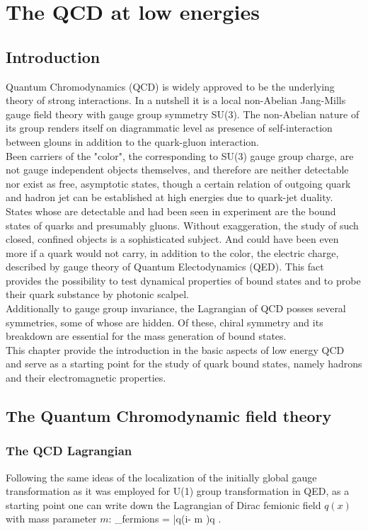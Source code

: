 \chapter{The QCD at low energies}
\label{chap:QCD_low}

\section{Introduction}
Quantum Chromodynamics (QCD) is widely approved to be the underlying theory of strong interactions. In a nutshell it is a local non-Abelian Jang-Mills gauge field theory with gauge group symmetry SU(3). The non-Abelian nature of its group renders itself on diagrammatic level as presence of self-interaction between glouns in addition to the quark-gluon interaction. 
\\

Been carriers of the "color", the corresponding to SU(3) gauge group charge, are not gauge independent objects themselves, and therefore are neither detectable nor exist as free, asymptotic states, though a certain relation of outgoing quark and hadron jet can be established at high energies due to quark-jet duality. States whose are detectable and had been seen in experiment are the bound states of quarks and presumably gluons. Without exaggeration, the study of such closed, confined objects is a sophisticated subject. And could have been even more if a quark would not carry, in addition to the color, the electric charge, described by gauge theory of Quantum Electodynamics (QED). This fact provides the possibility to test dynamical properties of bound states and to probe their quark substance by photonic scalpel. 
\\

Additionally to gauge group invariance, the Lagrangian of QCD posses several symmetries, some of whose are hidden. Of these, chiral symmetry and its breakdown are essential for the mass generation of bound states. 
\\

This chapter provide the introduction in the basic aspects of low energy QCD and serve as a starting point for the study of quark bound states, namely hadrons and their electromagnetic properties.



\section{The Quantum Chromodynamic field theory}
	\subsection{The QCD Lagrangian}
	Following the same ideas of the localization of the initially global gauge transformation as it was employed for U(1) group transformation in QED, as a starting point one can write down the Lagrangian of Dirac femionic field $q(x)$ with mass parameter $m$:
	\beqa
		_{fermions} = \bar{q}(i\dslash - m )q \;.
	\eeqa
	
